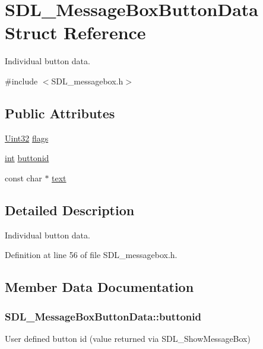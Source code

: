 \hypertarget{struct_s_d_l___message_box_button_data}{\section{S\-D\-L\-\_\-\-Message\-Box\-Button\-Data Struct Reference}
\label{struct_s_d_l___message_box_button_data}
}


Individual button data.  




{\ttfamily \#include $<$S\-D\-L\-\_\-messagebox.\-h$>$}

\subsection*{Public Attributes}
\begin{DoxyCompactItemize}
\item 
\hyperlink{_s_d_l__stdinc_8h_add440eff171ea5f55cb00c4a9ab8672d}{Uint32} \hyperlink{struct_s_d_l___message_box_button_data_a426c8b5da0e718242c7840706d95de0b}{flags}
\item 
\hyperlink{_s_d_l__thread_8h_a6a64f9be4433e4de6e2f2f548cf3c08e}{int} \hyperlink{struct_s_d_l___message_box_button_data_a22938886a6b13792006cc5c91fa38e92}{buttonid}
\item 
const char $\ast$ \hyperlink{struct_s_d_l___message_box_button_data_af35f3062f0577159284c8828caaf08e4}{text}
\end{DoxyCompactItemize}


\subsection{Detailed Description}
Individual button data. 

Definition at line 56 of file S\-D\-L\-\_\-messagebox.\-h.



\subsection{Member Data Documentation}
\hypertarget{struct_s_d_l___message_box_button_data_a22938886a6b13792006cc5c91fa38e92}{
\subsubsection[{buttonid}]{ S\-D\-L\-\_\-\-Message\-Box\-Button\-Data\-::buttonid}}\label{struct_s_d_l___message_box_button_data_a22938886a6b13792006cc5c91fa38e92}
User defined button id (value returned via S\-D\-L\-\_\-\-Show\-Message\-Box) 

